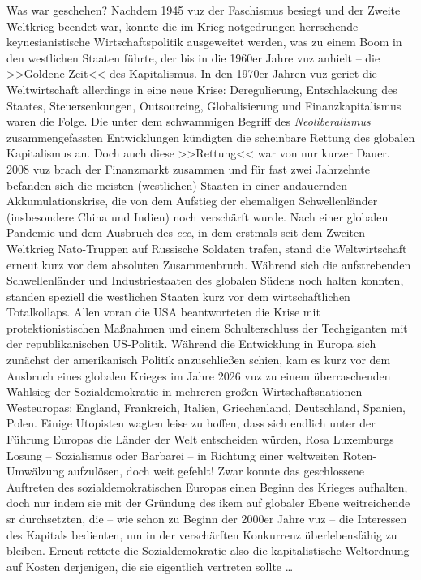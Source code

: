 Was war geschehen? Nachdem 1945 \ac{vuz} der Faschismus besiegt und der Zweite
Weltkrieg beendet war, konnte die im Krieg notgedrungen herrschende
keynesianistische Wirtschaftspolitik ausgeweitet werden, was zu einem Boom in 
den westlichen Staaten führte, der bis in die 1960er Jahre \ac{vuz} anhielt --
die >>Goldene Zeit<< des Kapitalismus.
In den 1970er Jahren \ac{vuz} geriet die Weltwirtschaft allerdings in eine neue
Krise: Deregulierung, Entschlackung des Staates, Steuersenkungen, Outsourcing,
Globalisierung und Finanzkapitalismus waren die Folge. 
Die unter dem schwammigen Begriff des \emph{Neoliberalismus} zusammengefassten
Entwicklungen kündigten die scheinbare Rettung des globalen
Kapitalismus an.
Doch auch diese >>Rettung<< war von nur kurzer Dauer. 
2008 \ac{vuz} brach der Finanzmarkt zusammen und für fast zwei Jahrzehnte
befanden sich die meisten (westlichen) Staaten in einer andauernden
Akkumulationskrise, die von dem Aufstieg der ehemaligen Schwellenländer
(insbesondere China und Indien) noch verschärft wurde. 
Nach einer globalen Pandemie und dem Ausbruch des \emph{\ac{eec}},
in dem erstmals seit dem Zweiten Weltkrieg Nato-Truppen auf Russische Soldaten
trafen, stand die Weltwirtschaft erneut kurz vor dem absoluten Zusammenbruch. 
Während sich die aufstrebenden Schwellenländer und Industriestaaten des
globalen Südens noch halten konnten, standen speziell die westlichen Staaten
kurz vor dem wirtschaftlichen Totalkollaps. 
Allen voran die USA beantworteten die Krise mit protektionistischen Maßnahmen
und einem Schulterschluss der Techgiganten mit der republikanischen US-Politik.
Während die Entwicklung in Europa sich zunächst der amerikanisch Politik
anzuschließen schien, kam es kurz vor dem Ausbruch eines globalen Krieges im
Jahre 2026 \ac{vuz} zu einem überraschenden Wahlsieg der Sozialdemokratie in
mehreren großen Wirtschaftsnationen Westeuropas: England, Frankreich, Italien,
Griechenland, Deutschland, Spanien, Polen.
Einige Utopisten wagten leise zu hoffen, dass sich endlich unter der Führung
Europas die Länder der Welt entscheiden würden, Rosa Luxemburgs Losung --
Sozialismus oder Barbarei -- in Richtung einer weltweiten Roten-Umwälzung
aufzulösen, doch weit gefehlt!
Zwar konnte das geschlossene Auftreten des sozialdemokratischen Europas einen
Beginn des Krieges aufhalten, doch nur indem sie mit der Gründung des \ac{ikem} 
auf globaler Ebene weitreichende \ac{sr} durchsetzten, die -- wie schon zu
Beginn der 2000er Jahre \ac{vuz} -- die Interessen des Kapitals bedienten, um in
der verschärften Konkurrenz überlebensfähig zu bleiben.
Erneut rettete die Sozialdemokratie also die kapitalistische Weltordnung auf 
Kosten derjenigen, die sie eigentlich vertreten sollte \dots{}

